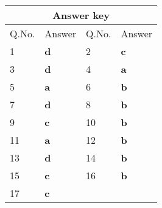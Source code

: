 \begin{table}[H]
	\centering
	
	\begin{tabular}{|p{1.5cm}|p{1.5cm}||p{1.5cm}|p{1.5cm}|}
		\hline
		\multicolumn{4}{|c|}{\textbf{Answer key}}\\\hline\hline
		\rowcolor{ocrel}Q.No.&Answer&Q.No.&Answer\\\hline
		1&\textbf{d}&2&\textbf{c}\\\hline
		3&\textbf{d}&4&\textbf{a}\\\hline
		5&\textbf{a}&6&\textbf{b}\\\hline
		7&\textbf{d}&8&\textbf{b}\\\hline
		9&\textbf{c}&10&\textbf{b}\\\hline
		11&\textbf{a}&12&\textbf{b}\\\hline
		13&\textbf{d}&14&\textbf{b}\\\hline
		15&\textbf{c}&16&\textbf{b}\\\hline
		17&\textbf{c}&&\\\hline
	\end{tabular}
\end{table}



